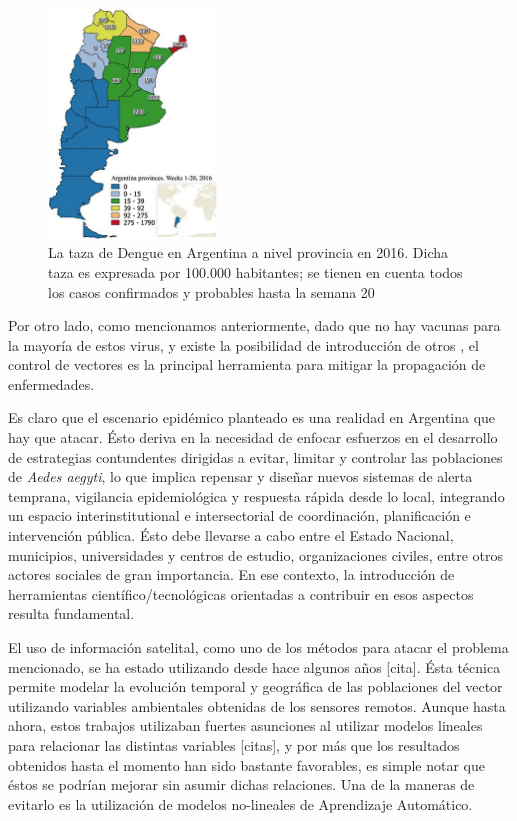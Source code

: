     \begin{figure}
    \centering%
    \includegraphics[width=0.4\textwidth]{images/dengue}%
    \caption{La taza de Dengue en Argentina a nivel provincia en 2016.
            Dicha taza es expresada por 100.000 habitantes; se tienen en cuenta
            todos los casos confirmados y probables hasta la semana 20}\label{fig:dengue}
    \end{figure}

  \par Por otro lado, como mencionamos anteriormente, dado que no hay vacunas para la
    mayoría de estos virus, y existe la posibilidad de introducción de otros \cite{emergencia_viral},
    el control de vectores es la principal herramienta para mitigar la
    propagación de enfermedades.


  \par Es claro que el escenario epidémico planteado es una realidad en Argentina
    que hay que atacar. Ésto deriva en la necesidad de enfocar esfuerzos en el
    desarrollo de estrategias contundentes dirigidas a evitar, limitar y controlar
    las poblaciones de \textit{Aedes aegyti}, lo que implica repensar y diseñar
    nuevos sistemas de alerta temprana, vigilancia epidemiológica y respuesta
    rápida desde lo local, integrando un espacio interinstitutional e
    intersectorial de coordinación, planificación e intervención pública. Ésto debe
    llevarse a cabo entre el Estado Nacional, municipios, universidades y centros
    de estudio, organizaciones civiles, entre otros actores sociales de gran importancia.
    En ese contexto, la introducción de herramientas científico/tecnológicas orientadas
    a contribuir en esos aspectos resulta fundamental.

  \par El uso de información satelital, como uno de los métodos para atacar el
    problema mencionado, se ha estado utilizando desde hace algunos años [cita].
    Ésta técnica permite modelar la evolución temporal y geográfica de las
    poblaciones del vector utilizando variables ambientales obtenidas de los
    sensores remotos. Aunque hasta ahora, estos trabajos utilizaban fuertes asunciones
    al utilizar modelos lineales para relacionar las distintas variables [citas], y por más
    que los resultados obtenidos hasta el momento han sido bastante
    favorables, es simple notar que éstos se podrían mejorar sin asumir dichas relaciones.
    Una de la maneras de evitarlo es la utilización de modelos no-lineales de
    Aprendizaje Automático.

